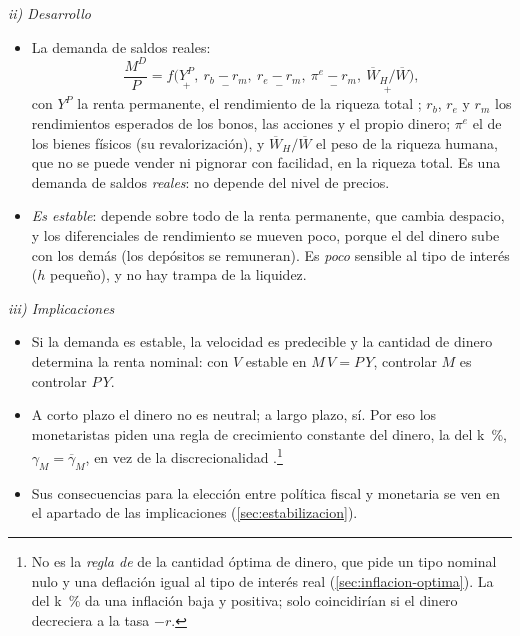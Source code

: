 \documentclass[11pt]{article}
\begin{document}
\hspace*{3.6em}\emph{ii) Desarrollo}

\begin{itemize}
\item La demanda de saldos reales\nocite{MishkinMatthewsGiuliodori2013}:
  \begin{equation}
  \frac{M^D}{P}=f\Big(\underset{+}{Y^P},\ \underset{-}{r_b-r_m},\ \underset{-}{r_e-r_m},\ \underset{-}{\pi^e-r_m},\ \underset{+}{\overline{W}_H/\overline{W}}\Big), \label{eq:demanda-dinero-friedman}
  \end{equation}
  con $Y^P$ la renta permanente, el rendimiento de la riqueza total ; $r_b$, $r_e$ y $r_m$ los rendimientos esperados de los bonos, las acciones y el propio dinero; $\pi^e$ el de los bienes físicos (su revalorización), y $\overline{W}_H/\overline{W}$ el peso de la riqueza humana, que no se puede vender ni pignorar con facilidad, en la riqueza total. Es una demanda de saldos \emph{reales}: no depende del nivel de precios.
\item \emph{Es estable}: depende sobre todo de la renta permanente, que cambia despacio, y los diferenciales de rendimiento se mueven poco, porque el del dinero sube con los demás (los depósitos se remuneran). Es \emph{poco} sensible al tipo de interés ($h$ pequeño), y no hay trampa de la liquidez.
\end{itemize}

\hspace*{3.6em}\emph{iii) Implicaciones}

\begin{itemize}
\item Si la demanda es estable, la velocidad es predecible y la cantidad de dinero determina la renta nominal: con $V$ estable en $M\,V=P\,Y$, controlar $M$ es controlar $P\,Y$.
\item A corto plazo el dinero no es neutral; a largo plazo, sí. Por eso los monetaristas piden una regla de crecimiento constante del dinero, la del k~\%, $\gamma_M=\overline{\gamma}_M$\nocite{Friedman1960Program}, en vez de la discrecionalidad .\footnote{No es la \emph{regla de } de la cantidad óptima de dinero, que pide un tipo nominal nulo y una deflación igual al tipo de interés real\nocite{Friedman1969Optimum} (\ref{sec:inflacion-optima}). La del k~\% da una inflación baja y positiva; solo coincidirían si el dinero decreciera a la tasa $-r$.}
\item Sus consecuencias para la elección entre política fiscal y monetaria se ven en el apartado de las implicaciones (\ref{sec:estabilizacion}).
\end{itemize}
\end{document}
